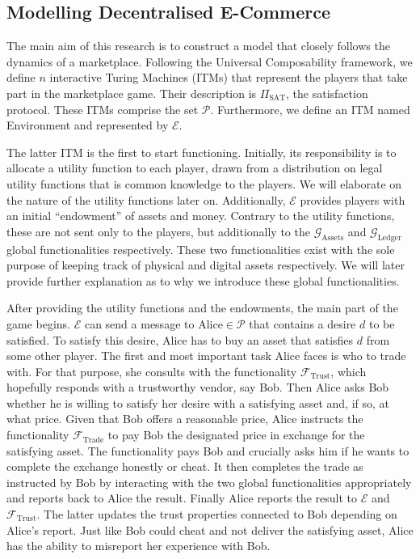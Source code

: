 \subsection{Modelling Decentralised E-Commerce}
  The main aim of this research is to construct a model that closely follows the dynamics
  of a marketplace. Following the Universal Composability framework, we define $n$
  interactive Turing Machines (ITMs) that represent the players that take part in the
  marketplace game. Their description is $\Pi_{\mathrm{SAT}}$, the satisfaction protocol.
  These ITMs comprise the set $\mathcal{P}$. Furthermore, we define an ITM named
  Environment and represented by $\mathcal{E}$.

  The latter ITM is the first to start functioning. Initially, its responsibility is to
  allocate a utility function to each player, drawn from a distribution on legal utility
  functions that is common knowledge \cite{knowledge} to the players. We will elaborate on
  the nature of the utility functions later on. Additionally, $\mathcal{E}$ provides
  players with an initial ``endowment'' of assets and money. Contrary to the utility
  functions, these are not sent only to the players, but additionally to the
  $\mathcal{G}_{\mathrm{Assets}}$ and $\mathcal{G}_{\mathrm{Ledger}}$ global
  functionalities respectively. These two functionalities exist with the sole purpose of
  keeping track of physical and digital assets respectively. We will later provide further
  explanation as to why we introduce these global functionalities.

  After providing the utility functions and the endowments, the main part of the game
  begins. $\mathcal{E}$ can send a message to $\mathrm{Alice} \in \mathcal{P}$ that
  contains a desire $d$ to be satisfied. To satisfy this desire, Alice has to buy an asset
  that satisfies $d$ from some other player. The first and most important task Alice faces
  is who to trade with. For that purpose, she consults with the functionality
  $\mathcal{F}_{\mathrm{Trust}}$, which hopefully responds with a trustworthy vendor, say
  Bob. Then Alice asks Bob whether he is willing to satisfy her desire with a satisfying
  asset and, if so, at what price. Given that Bob offers a reasonable price, Alice
  instructs the functionality $\mathcal{F}_{\mathrm{Trade}}$ to pay Bob the designated
  price in exchange for the satisfying asset. The functionality pays Bob and crucially
  asks him if he wants to complete the exchange honestly or cheat. It then completes the
  trade as instructed by Bob by interacting with the two global functionalities
  appropriately and reports back to Alice the result. Finally Alice reports the result to
  $\mathcal{E}$ and $\mathcal{F}_{\mathrm{Trust}}$. The latter updates the trust
  properties connected to Bob depending on Alice's report. Just like Bob could cheat and
  not deliver the satisfying asset, Alice has the ability to misreport her experience with
  Bob.

